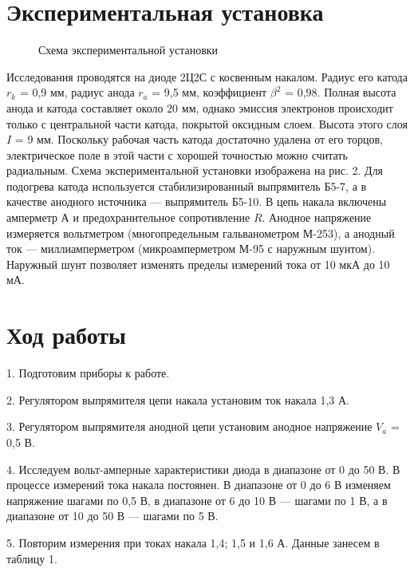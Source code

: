 \documentclass[a4paper,12pt]{article}
\begin{document}
\section{Экспериментальная установка}
\begin{figure} [h]
	\centering
	\caption{Схема экспериментальной установки}
	\label{mah}
\end{figure}
\par Исследования проводятся на диоде 2Ц2С с косвенным накалом. Радиус его катода $r_k$ = 0,9 мм, радиус анода $r_a$ = 9,5 мм, коэффициент $\beta ^2$ = 0,98. Полная высота анода и катода составляет около 20 мм, однако эмиссия электронов происходит только с центральной части катода, покрытой оксидным слоем. Высота этого слоя $I$ = 9 мм. Поскольку рабочая часть катода достаточно удалена от его торцов, электрическое поле в этой части с хорошей точностью можно считать радиальным.
Схема экспериментальной установки изображена на рис. 2. Для подогрева катода используется стабилизированный выпрямитель Б5-7, а в качестве анодного источника — выпрямитель Б5-10. В цепь накала включены амперметр $А$ и предохранительное сопротивление $R$. Анодное напряжение измеряется вольтметром (многопредельным гальванометром М-253), а анодный ток — миллиамперметром (микроамперметром М-95 с наружным шунтом). Наружный шунт позволяет изменять пределы измерений тока от 10 мкА до 10 мА.

\section{Ход работы}

\par 1. Подготовим приборы к работе.
\par 2. Регулятором выпрямителя цепи накала установим ток накала 1,3 А.
\par 3. Регулятором выпрямителя анодной цепи установим анодное напряжение $V_a$ = 0,5 В.
\par 4. Исследуем вольт-амперные характеристики диода в диапазоне от 0 до 50 В. В процессе измерений тока накала постоянен. В диапазоне от 0 до 6 В изменяем напряжение шагами по 0,5 В, в диапазоне от 6 до 10 В — шагами по 1 В, а в диапазоне от 10 до 50 В — шагами по 5 В.
\par 5. Повторим измерения при токах накала 1,4; 1,5 и 1,6 А. Данные занесем в таблицу 1.
\end{document}
